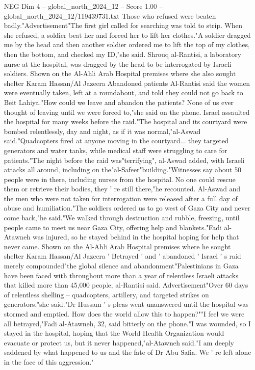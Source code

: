\begin{textsample}{NEG Dim 4 – global\_north\_2024\_12 – Score 1.00 – global\_north\_2024\_12/119439731.txt}
Those who refused were beaten badly."Advertisement"The first girl called for searching was told to strip.
When she refused, a soldier beat her and forced her to lift her clothes."A soldier dragged me by the head and then another soldier ordered me to lift the top of my clothes, then the bottom, and checked my ID,"she said.
Shrouq al-Rantisi, a laboratory nurse at the hospital, was dragged by the head to be interrogated by Israeli soldiers.
Shown on the Al-Ahli Arab Hospital premises where she also sought shelter Karam Hassan/Al Jazeera Abandoned patients Al-Rantisi said the women were eventually taken, left at a roundabout, and told they could not go back to Beit Lahiya."How could we leave and abandon the patients?
None of us ever thought of leaving until we were forced to,"she said on the phone.
Israel assaulted the hospital for many weeks before the raid."The hospital and its courtyard were bombed relentlessly, day and night, as if it was normal,"al-Aswad said."Quadcopters fired at anyone moving in the courtyard... they targeted generators and water tanks, while medical staff were struggling to care for patients."The night before the raid was"terrifying", al-Aswad added, with Israeli attacks all around, including on the"al-Safeer"building."Witnesses say about 50 people were in there, including nurses from the hospital.
No one could rescue them or retrieve their bodies, they ' re still there,"he recounted.
Al-Aswad and the men who were not taken for interrogation were released after a full day of abuse and humiliation."The soldiers ordered us to go west of Gaza City and never come back,"he said."We walked through destruction and rubble, freezing, until people came to meet us near Gaza City, offering help and blankets."Fadi al-Atawneh was injured, so he stayed behind in the hospital hoping for help that never came.
Shown on the Al-Ahli Arab Hospital premises where he sought shelter Karam Hassan/Al Jazeera ' Betrayed ' and ' abandoned ' Israel ' s raid merely compounded"the global silence and abandonment"Palestinians in Gaza have been faced with throughout more than a year of relentless Israeli attacks that killed more than 45,000 people, al-Rantisi said.
Advertisement"Over 60 days of relentless shelling -- quadcopters, artillery, and targeted strikes on generators,"she said."Dr Hussam ' s pleas went unanswered until the hospital was stormed and emptied.
How does the world allow this to happen?""I feel we were all betrayed,"Fadi al-Atawneh, 32, said bitterly on the phone."I was wounded, so I stayed in the hospital, hoping that the World Health Organization would evacuate or protect us, but it never happened,"al-Atawneh said."I am deeply saddened by what happened to us and the fate of Dr Abu Safia.
We ' re left alone in the face of this aggression."

\end{textsample}
